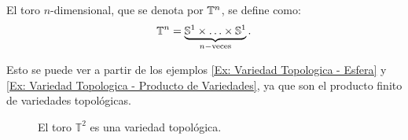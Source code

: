 \begin{example}[$n-$Toro]\label{Ex: Variedad Topologica - Toro}
	El toro $n$-dimensional, que se denota por $\mathbb{T}^n$, se define como:
	\[
		\mathbb{T}^n = \underbrace{\mathbb{S}^1 \times \hdots \times \mathbb{S}^1}_{n-\text{veces}}.
	\]

	Esto se puede ver a partir de los ejemplos \ref{Ex: Variedad Topologica - Esfera} y \ref{Ex: Variedad Topologica - Producto de Variedades}, ya que son el producto finito de variedades topológicas.
\end{example}

\begin{figure}[h]
	\centering
	
	\caption{El toro $\mathbb{T}^{2}$ es una variedad topológica.}
\end{figure}
